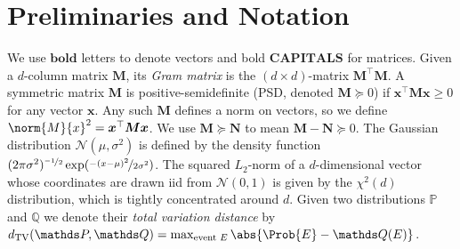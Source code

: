 \documentclass{article}
\renewcommand{\vec}[1]{\bm{#1}}
\renewcommand{\Pr}{\mathds{P}}
\DeclarePairedDelimiter{\abs}||
\providecommand\transp{\top}
\let\transpsymbol\transp
\renewcommand{\transp}[1]{#1^\transpsymbol}
\newcommand{\Normal}{\mathcal{N}}
\newcommand{\XtX}[1]{\transp{#1}{#1}}
\begin{document}
\section{Preliminaries and Notation}
\label{sec:preliminaries}

We use $\vec{bold}$ letters to denote vectors and bold
$\vec{CAPITALS}$ for matrices.  Given a $d$-column matrix $\vec M$,
its \emph{Gram matrix} is the $(d\times d)$-matrix $\XtX{\vec M}$.  A
symmetric matrix $\vec M$ is positive-semidefinite (PSD, denoted
$\vec M\succeq 0$) if $\transp{\vec x} \vec M \vec x \geq 0$ for any
vector $\vec x$.  Any such $\vec M$ defines a norm on vectors, so we
define $\norm{M}{x}^2 = \transp{\vec x} \vec M \vec x$.  We use
$\vec M\succeq \vec N$ to mean $\vec M-\vec N\succeq 0$.  The Gaussian
distribution $\Normal(\mu,\sigma^2)$ is defined by the density
function
$(2\pi\sigma^2)^{\nicefrac{-1}{2}}\exp(\nicefrac{-(x-\mu)^2}{2\sigma^2})$. The
squared $L_2$-norm of a $d$-dimensional vector whose coordinates are
drawn iid from $\Normal(0,1)$ is given by the $\chi^2(d)$
distribution, which is tightly concentrated around $d$.  Given two
distributions $\Pr$ and $\mathds Q$ we denote their \emph{total
  variation distance} by
$d_{\rm TV}(\mathds P,\mathds Q) = \max_{\text{event
  }E}\abs{\Prob{E}-{\mathds
    Q}(E)}$.  %
\end{document}
